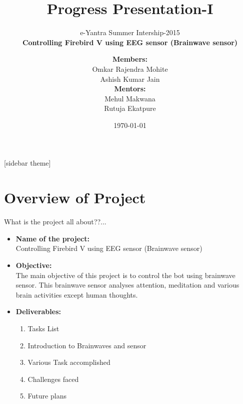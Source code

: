\documentclass[10pt, a4paper]{beamer}
\begin{document}
	\title{Progress Presentation-I}
	\subtitle{e-Yantra Summer Intership-2015 \\ \textbf{Controlling Firebird V using EEG sensor (Brainwave sensor)} }
	\author{\textbf{Members:}\\Omkar Rajendra Mohite\\Ashish Kumar Jain\\ 
	\textbf{Mentors:}\\Mehul Makwana\\Rutuja Ekatpure }
	\date{\today}
	\frame{\titlepage}

[sidebar theme]
\section{Overview of Project}
\begin{frame}{What is the project all about??...}
	\begin{itemize}
		\item \textbf{Name of the project:}\\Controlling Firebird V using EEG sensor (Brainwave sensor)
		\item \textbf{Objective:}\\The main objective of this project is to control the bot using brainwave sensor. This brainwave sensor analyses attention, meditation and various brain activities except human thoughts.
		\item \textbf{Deliverables:}\\\begin{enumerate}
			\item Tasks List
			\item Introduction to Brainwaves and sensor
			\item Various Task accomplished
			\item Challenges faced
			\item Future plans
		\end{enumerate}
	\end{itemize}
\end{frame}
\end{document}
